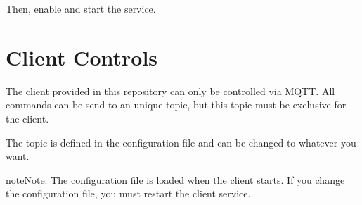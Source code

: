 \documentclass[letterpaper,10pt,english]{sphinxmanual}
\begin{document}
\sphinxAtStartPar
Then, enable and start the service.

\sphinxstepscope


\chapter{Client Controls}
\label{\detokenize{client_guide:client-controls}}\label{\detokenize{client_guide::doc}}
\sphinxAtStartPar
The client provided in this repository can only be controlled via MQTT.
All commands can be send to an unique topic, but this topic must be exclusive for the client.

\sphinxAtStartPar
The topic is defined in the configuration file and can be changed to whatever you want.

\begin{sphinxadmonition}{note}{Note:}
\sphinxAtStartPar
The configuration file is loaded when the client starts. If you change the configuration file, you must restart
the client service.
\end{sphinxadmonition}
\end{document}
